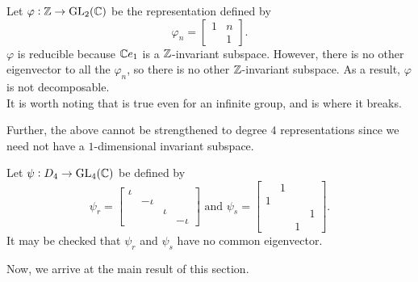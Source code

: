 			\begin{fex}
				Let $\varphi : \mathbb{Z} \to \operatorname{GL}_2(\mathbb{C})$ be the representation defined by
				\[ \varphi_n =
				\begin{bmatrix}
					1 & n \\
					& 1	
				\end{bmatrix}. \]
				$\varphi$ is reducible because $\mathbb{C} e_1$ is a $\mathbb{Z}$-invariant subspace. However, there is no other eigenvector to all the $\varphi_n$, so there is no other $\mathbb{Z}$-invariant subspace. As a result, $\varphi$ is not decomposable.\\
				It is worth noting that  is true even for an infinite group, and  is where it breaks.
			\end{fex}

			Further, the above cannot be strengthened to degree $4$ representations since we need not have a $1$-dimensional invariant subspace.

			\begin{fex}
				Let $\psi : D_4 \to \operatorname{GL}_4(\mathbb{C})$ be defined by
				\[ \psi_r = \begin{bmatrix}
					\iota & & & \\
					& -\iota & & \\
					& & \iota & \\
					& & & -\iota
				\end{bmatrix}
				\text{ and }
				\psi_s = \begin{bmatrix}
					& 1 & & \\
					1 & & & \\
					& & & 1 \\
					& & 1 &
				\end{bmatrix}.\]
				It may be checked that $\psi_r$ and $\psi_s$ have no common eigenvector.
			\end{fex}

			Now, we arrive at the main result of this section.

